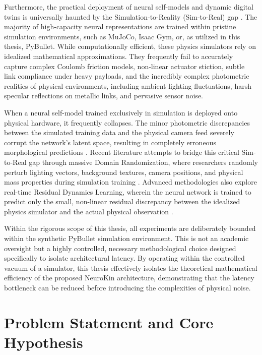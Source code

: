\documentclass[12pt,a4paper,oneside]{report}
\begin{document}
Furthermore, the practical deployment of neural self-models and dynamic digital twins is universally haunted by the Simulation-to-Reality (Sim-to-Real) gap \cite{tan2018simtoreal, aljalbout2026realitygap}. The majority of high-capacity neural representations are trained within pristine simulation environments, such as MuJoCo, Isaac Gym, or, as utilized in this thesis, PyBullet. While computationally efficient, these physics simulators rely on idealized mathematical approximations. They frequently fail to accurately capture complex Coulomb friction models, non-linear actuator stiction, subtle link compliance under heavy payloads, and the incredibly complex photometric realities of physical environments, including ambient lighting fluctuations, harsh specular reflections on metallic links, and pervasive sensor noise.

When a neural self-model trained exclusively in simulation is deployed onto physical hardware, it frequently collapses. The minor photometric discrepancies between the simulated training data and the physical camera feed severely corrupt the network's latent space, resulting in completely erroneous morphological predictions \cite{rezvani2024robust}. Recent literature attempts to bridge this critical Sim-to-Real gap through massive Domain Randomization, where researchers randomly perturb lighting vectors, background textures, camera positions, and physical mass properties during simulation training \cite{tan2018simtoreal}. Advanced methodologies also explore real-time Residual Dynamics Learning, wherein the neural network is trained to predict only the small, non-linear residual discrepancy between the idealized physics simulator and the actual physical observation \cite{qiu2024swim2real, lim2025splat2real}.

Within the rigorous scope of this thesis, all experiments are deliberately bounded within the synthetic PyBullet simulation environment. This is not an academic oversight but a highly controlled, necessary methodological choice designed specifically to isolate architectural latency. By operating within the controlled vacuum of a simulator, this thesis effectively isolates the theoretical mathematical efficiency of the proposed NeuroKin architecture, demonstrating that the latency bottleneck can be reduced before introducing the complexities of physical noise.

\section{Problem Statement and Core Hypothesis}
\label{sec:problem_hypothesis}
\end{document}
